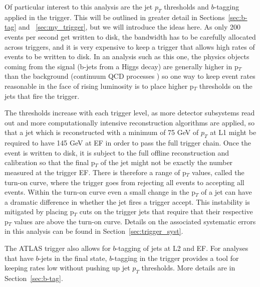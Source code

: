 Of particular interest to this analysis are the jet $p_T$ thresholds and $b$-tagging applied in the trigger.  This 
will be outlined in greater detail in Sections~\ref{sec:b-tag} and ~\ref{sec:my_trigger}, but we will introduce the ideas here.  As 
only 200 events per second get written to disk, the bandwidth has to be carefully allocated across triggers, 
and it is very expensive to keep a trigger that allows high rates of events to be written to disk.  
In an analysis such as this one, the physics objects coming from the signal (b-jets 
from a Higgs decay) are generally higher in p$_T$ than the background (continuum QCD processes
) so one way to keep event rates reasonable in the face of rising luminosity is to place higher p$_T$ 
thresholds on the jets that fire the trigger.   

The thresholds increase with each trigger level, as more detector subsystems read out and more
computationally intensive reconstruction algorithms are applied, so that 
a jet which is reconstructed with a minimum of 75 GeV of $p_T$ at L1 
might be required to have 145 GeV at EF in order to pass the full trigger chain.  Once the event 
is written to disk, it is subject to the full offline reconstruction and calibration so that the final p$_T$ 
of the jet might not be exactly the number measured at the trigger EF.  There is therefore a range 
of p$_T$ values, called the turn-on curve, where the trigger goes from rejecting 
all events to accepting all events.  Within the turn-on curve even a small change in the p$_T$
of a jet can have a dramatic difference in whether the jet fires a trigger accept.  This 
instability is mitigated by placing p$_T$ cuts on the trigger jets that require that their respective p$_T$ 
values are above the turn-on curve.  Details on the associated systematic errors in this analysis 
can be found in Section~\ref{sec:trigger_syst}.  

The ATLAS trigger also allows for $b$-tagging of jets at L2 and EF.  For analyses that have 
$b$-jets in the final state, $b$-tagging in the trigger provides a tool for keeping rates 
low without pushing up jet $p_T$ thresholds.  More details are in Section~\ref{sec:b-tag}.








